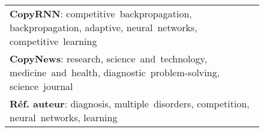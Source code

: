 \begin{figure}
{\begin{tabular}{|p{}|}
    \textbf{CopyRNN}: \textcolor{color5}{competitive}~\textcolor{color1}{backpropagation}, \textcolor{color1}{backpropagation}, \textcolor{color1}{adaptive}, \textcolor{color8}{neural}~\textcolor{color2}{networks}, \textcolor{color5}{competitive}~\textcolor{color0}{learning}\\

    \textbf{CopyNews}: research, science~and~technology, medicine~and~health, \textcolor{color4}{diagnostic}~\textcolor{color3}{problem-solving}, science~journal\\
    \textbf{Réf. auteur}: \textcolor{color1}{diagnosis}, \textcolor{color7}{multiple}~\textcolor{color0}{disorders}, \textcolor{color6}{competition}, \textcolor{color5}{neural}~\textcolor{color8}{networks}, \textcolor{color2}{learning}
    \vspace{0.2em}

    \end{tabular}%
    }
\end{figure}


